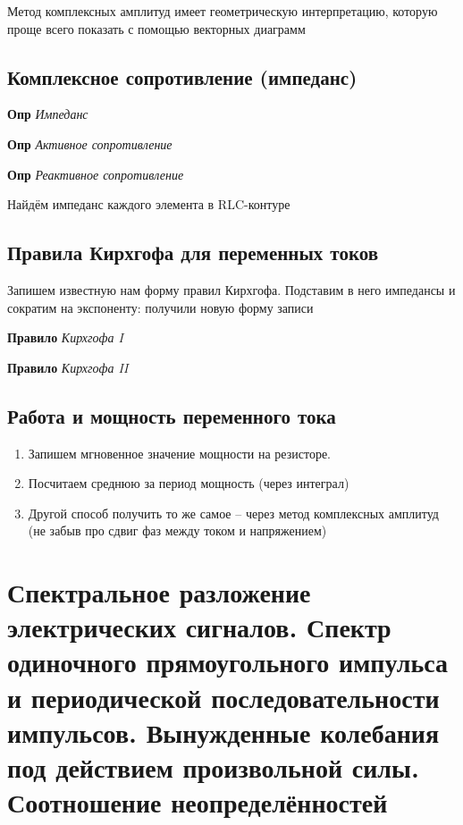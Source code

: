 \documentclass[a4paper, 14pt]{article}
\begin{document}
    Метод комплексных амплитуд имеет геометрическую интерпретацию, которую проще всего показать с помощью векторных
    диаграмм
    
    \subsection{Комплексное сопротивление (импеданс)}
    
    \textbf{Опр} \textit{Импеданс}
    
    \textbf{Опр} \textit{Активное сопротивление}
    
    \textbf{Опр} \textit{Реактивное сопротивление}
    
    Найдём импеданс каждого элемента в RLC-контуре
    
    \subsection{Правила Кирхгофа для переменных токов}
    
    Запишем известную нам форму правил Кирхгофа.
    Подставим в него импедансы и сократим на экспоненту: получили новую форму записи
    
    \textbf{Правило} \textit{Кирхгофа I}
    
    \textbf{Правило} \textit{Кирхгофа II}
    
    \subsection{Работа и мощность переменного тока}
    
    \begin{enumerate}
        \item Запишем мгновенное значение мощности на резисторе.
        \item Посчитаем среднюю за период мощность (через интеграл)
        \item Другой способ получить то же самое -- через метод комплексных амплитуд (не забыв про сдвиг фаз между
        током и напряжением)
    \end{enumerate}
    
    \section{Спектральное разложение электрических сигналов.
    Спектр одиночного прямоугольного импульса и периодической последовательности импульсов.
    Вынужденные колебания под действием произвольной силы.
    Соотношение неопределённостей}
    
\end{document}
